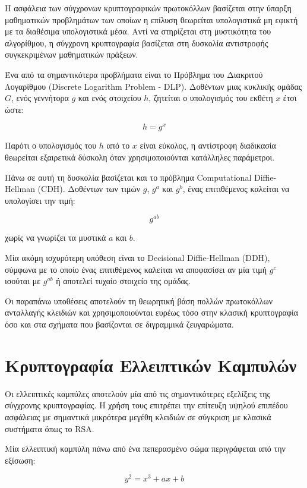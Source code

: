 \documentclass[12pt,a4paper]{report}
\begin{document}
Η ασφάλεια των σύγχρονων κρυπτογραφικών πρωτοκόλλων βασίζεται στην ύπαρξη
μαθηματικών προβλημάτων των οποίων η επίλυση θεωρείται υπολογιστικά μη εφικτή
με τα διαθέσιμα υπολογιστικά μέσα. Αντί να στηρίζεται στη μυστικότητα του
αλγορίθμου, η σύγχρονη κρυπτογραφία βασίζεται στη δυσκολία αντιστροφής
συγκεκριμένων μαθηματικών πράξεων.

Ένα από τα σημαντικότερα προβλήματα είναι το Πρόβλημα του Διακριτού
Λογαρίθμου (Discrete Logarithm Problem - DLP). Δοθέντων μιας κυκλικής ομάδας
$G$, ενός γεννήτορα $g$ και ενός στοιχείου $h$, ζητείται ο υπολογισμός του
εκθέτη $x$ έτσι ώστε:

\begin{equation}
h = g^x
\end{equation}

Παρότι ο υπολογισμός του $h$ από το $x$ είναι εύκολος, η αντίστροφη διαδικασία
θεωρείται εξαιρετικά δύσκολη όταν χρησιμοποιούνται κατάλληλες παράμετροι.

Πάνω σε αυτή τη δυσκολία βασίζεται και το πρόβλημα Computational
Diffie-Hellman (CDH). Δοθέντων των τιμών $g$, $g^a$ και $g^b$, ένας
επιτιθέμενος καλείται να υπολογίσει την τιμή:

\begin{equation}
g^{ab}
\end{equation}

χωρίς να γνωρίζει τα μυστικά $a$ και $b$.

Μία ακόμη ισχυρότερη υπόθεση είναι το Decisional Diffie-Hellman (DDH),
σύμφωνα με το οποίο ένας επιτιθέμενος καλείται να αποφασίσει αν μία τιμή
$g^c$ ισούται με $g^{ab}$ ή αποτελεί τυχαίο στοιχείο της ομάδας.

Οι παραπάνω υποθέσεις αποτελούν τη θεωρητική βάση πολλών πρωτοκόλλων
ανταλλαγής κλειδιών και χρησιμοποιούνται ευρέως τόσο στην κλασική
κρυπτογραφία όσο και στα σχήματα που βασίζονται σε διγραμμικά ζευγαρώματα.
\section{Κρυπτογραφία Ελλειπτικών Καμπυλών}

Οι ελλειπτικές καμπύλες αποτελούν μία από τις σημαντικότερες εξελίξεις της
σύγχρονης κρυπτογραφίας. Η χρήση τους επιτρέπει την επίτευξη υψηλού επιπέδου
ασφάλειας με σημαντικά μικρότερα μεγέθη κλειδιών σε σύγκριση με κλασικά
συστήματα όπως το RSA.

Μία ελλειπτική καμπύλη πάνω από ένα πεπερασμένο σώμα περιγράφεται από την
εξίσωση:

\begin{equation}
y^2 = x^3 + ax + b
\end{equation}
\end{document}
